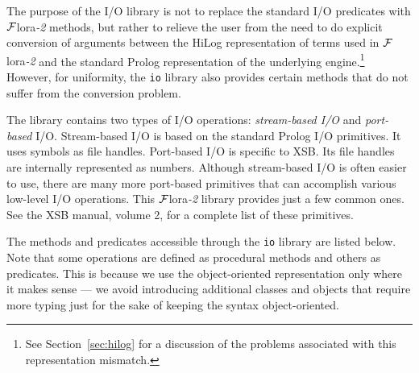 \documentclass[11pt]{article}
\newcommand{\FLORA}{{\mbox{\sc ${\cal F}${lora}\rm\emph{-2}}}\xspace}
\begin{document}
The purpose of the I/O library is not to replace the standard I/O predicates
with \FLORA methods, but rather to relieve the user from the need to do
explicit conversion of arguments between the HiLog representation of terms
used in \FLORA and the standard Prolog representation of the underlying
engine.\footnote{
  See Section~\ref{sec:hilog} for a discussion of the problems associated
  with this representation mismatch.
  }
However, for uniformity, the {\tt io} library also provides certain methods
that do not suffer from the conversion problem.

The library contains two types of I/O operations: \emph{stream-based I/O}
and \emph{port-based} I/O.  Stream-based I/O is based on the standard Prolog
I/O primitives. It uses symbols as file handles. Port-based I/O is specific
to XSB. Its file handles are internally represented as numbers. Although
stream-based I/O is often easier to use, there are many more port-based
primitives that can accomplish various low-level I/O operations. This
\FLORA library provides just a few common ones. See the XSB manual, volume
2, for a complete list of these primitives.

The methods and predicates accessible through the {\tt io} library are
listed below.  Note that some operations are defined as procedural methods
and others as predicates. This is because we use the object-oriented
representation only where it makes sense --- we avoid introducing
additional classes and objects that require more typing just for the sake
of keeping the syntax object-oriented.
\end{document}
